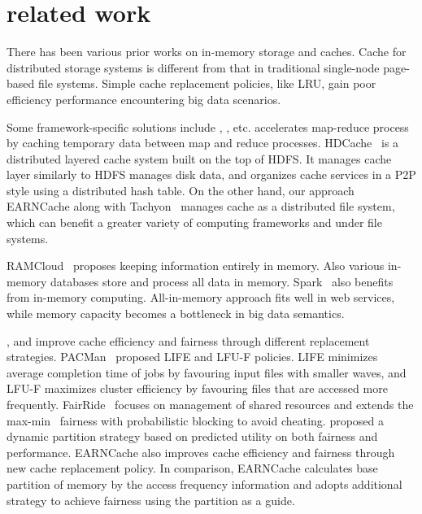 \documentclass[10pt,conference,letterpaper]{IEEEtran}
\begin{document}
\section{related work}
There has been various prior works on in-memory storage and caches. 
Cache for distributed storage systems is different from that in traditional single-node page-based file systems.
Simple cache replacement policies, like LRU, gain poor efficiency performance encountering big data scenarios.

Some framework-specific solutions include \cite{dist-cache-hdfs}, \cite{mapreduce-cache}, etc. 
\cite{mapreduce-cache} accelerates map-reduce process by caching temporary data between map and reduce processes.
HDCache~\cite{dist-cache-hdfs} is a distributed layered cache system built on the top of HDFS. It manages cache layer similarly to HDFS manages disk data, and organizes cache services in a P2P style using a distributed hash table.
On the other hand, our approach EARNCache along with Tachyon~\cite{tachyon} manages cache as a distributed file system, which can benefit a greater variety of computing frameworks and under file systems.

RAMCloud~\cite{ramcloud} proposes keeping information entirely in memory. Also various in-memory databases \cite{hstore} \cite{memcached} \cite{redis} store and process all data in memory. Spark~\cite{spark} also benefits from in-memory computing.
All-in-memory approach fits well in web services, while memory capacity becomes a bottleneck in big data semantics.

\cite{pacman}, \cite{fairride} and \cite{rate-aware} improve cache efficiency and fairness through different replacement strategies. 
PACMan~\cite{pacman} proposed LIFE and LFU-F policies. LIFE minimizes average completion time of jobs by favouring input files with smaller waves, and LFU-F maximizes cluster efficiency by favouring files that are accessed more frequently.
FairRide~\cite{fairride} focuses on management of shared resources and extends the max-min~\cite{maxmin}\cite{maxmin2} fairness with probabilistic blocking to avoid cheating.
\cite{rate-aware} proposed a dynamic partition strategy based on predicted utility on both fairness and performance. 
EARNCache also improves cache efficiency and fairness through new cache replacement policy. In comparison, EARNCache calculates base partition of memory by the access frequency information and adopts additional strategy to achieve fairness using the partition as a guide.
\end{document}
